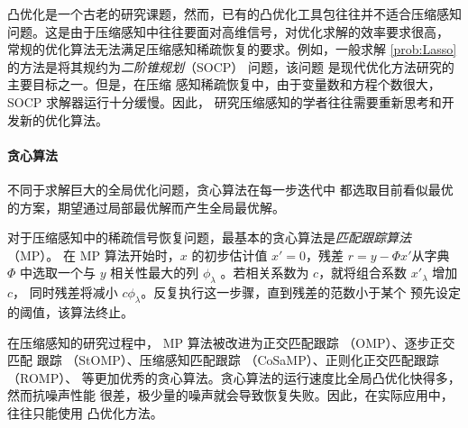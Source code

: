 凸优化是一个古老的研究课题，然而，已有的凸优化工具包往往并不适合压缩感知
问题。这是由于压缩感知中往往要面对高维信号，对优化求解的效率要求很高，
常规的优化算法无法满足压缩感知稀疏恢复的要求。例如，一般求解
\ref{prob:Lasso} 的方法是将其规约为\emph{二阶锥规划}（SOCP） 问题，该问题
是现代优化方法研究的主要目标之一。但是，在压缩
感知稀疏恢复中，由于变量数和方程个数很大，SOCP 求解器运行十分缓慢。因此，
研究压缩感知的学者往往需要重新思考和开发新的优化算法。

\paragraph{贪心算法} 不同于求解巨大的全局优化问题，贪心算法在每一步迭代中
都选取目前看似最优的方案，期望通过局部最优解而产生全局最优解。

对于压缩感知中的稀疏信号恢复问题，最基本的贪心算法是\emph{匹配跟踪算法}
（MP）。 在 MP 算法开始时，$x$ 的初步估计值 $x' = 0$，残差
$r = y - \Phi x'$从字典 $\Phi$ 中选取一个与 $y$ 相关性最大的列
$\phi_\lambda$ 。若相关系数为 $c$，就将组合系数 $x'_\lambda$ 增加 $c$，
同时残差将减小 $c \phi_\lambda$。反复执行这一步骤，直到残差的范数小于某个
预先设定的阈值，该算法终止。

在压缩感知的研究过程中， MP 算法被改进为正交匹配跟踪 （OMP）、逐步正交匹配
跟踪 （StOMP）、压缩感知匹配跟踪 （CoSaMP）、正则化正交匹配跟踪 （ROMP）、
等更加优秀的贪心算法。贪心算法的运行速度比全局凸优化快得多，然而抗噪声性能
很差，极少量的噪声就会导致恢复失败。因此，在实际应用中，往往只能使用
凸优化方法。
